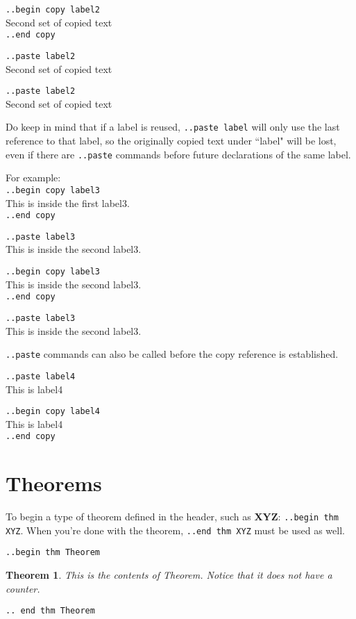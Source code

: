 \documentclass[12pt]{article}
\newcommand{\nl}{\\}
\renewcommand\bold{\textbf}
\numberwithin{equation}{section}
\newtheorem*{Theorem}{Theorem}
\begin{document}
\begin{flushleft}
\bigskip

\verb|..begin copy label2| \nl
Second set of copied text \nl
\verb|..end copy|

\bigskip

\verb|..paste label2| \nl
Second set of copied text \nl

\medskip

\verb|..paste label2| \nl
Second set of copied text \nl

\bigskip

Do keep in mind that if a label is reused, \verb|..paste label| will only use the last reference to that label, so the originally copied text under ``label" will be lost, even if there are \verb|..paste| commands before future declarations of the same label.

\bigskip

For example: \nl
\verb|..begin copy label3|\nl
This is inside the first label3. \nl
\verb|..end copy|

\bigskip

\verb|..paste label3| \nl
This is inside the second label3. \nl

\bigskip

\verb|..begin copy label3|\nl
This is inside the second label3. \nl
\verb|..end copy|

\bigskip

\verb|..paste label3| \nl
This is inside the second label3. \nl

\bigskip

\verb|..paste| commands can also be called before the copy reference is established.

\verb|..paste label4| \nl
This is label4 \nl

\bigskip

\verb|..begin copy label4| \nl
This is label4 \nl
\verb|..end copy|

\newpage

\section{Theorems}

\bigskip

To begin a type of theorem defined in the header, such as \bold{XYZ}: \verb|..begin thm XYZ|. When you're done with the theorem, \verb|..end thm XYZ| must be used as well.

\medskip

\verb|..begin thm Theorem|
\begin{Theorem}
This is the contents of Theorem. Notice that it does not have a counter.
\end{Theorem}
\verb|.. end thm Theorem|


\end{flushleft}
\end{document}
